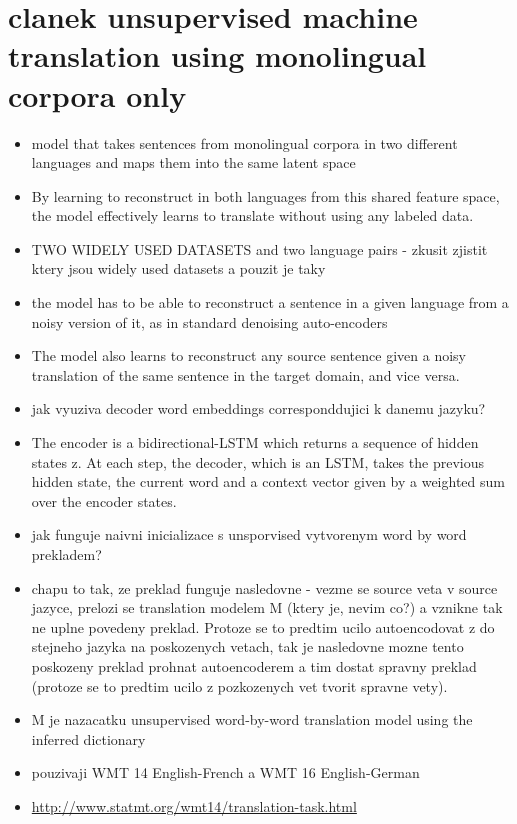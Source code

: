 \section{clanek unsupervised machine translation using monolingual corpora only}
\begin{itemize}
  \item model that takes sentences from monolingual corpora in two different languages and maps them into the same latent space
  \item By learning to reconstruct in both languages from this shared feature space, the model effectively learns to translate without using any labeled data.
  \item TWO WIDELY USED DATASETS and two language pairs - zkusit zjistit ktery jsou widely used datasets a pouzit je taky
  \item the model has to be able to reconstruct a sentence in a given language from a noisy version of it, as in standard denoising auto-encoders
  \item The model also learns to reconstruct any source sentence given a noisy translation of the same sentence in the target domain, and vice versa.
  \item jak vyuziva decoder word embeddings corresponddujici k danemu jazyku?
  \item The encoder is a bidirectional-LSTM which returns a sequence of hidden states z. At each step, the decoder, which is an LSTM, takes the previous hidden state, the current word and a context vector given by a weighted sum over the encoder states.
  \item jak funguje naivni inicializace s unsporvised vytvorenym word by word prekladem?
  \item chapu to tak, ze preklad funguje nasledovne - vezme se source veta v source jazyce, prelozi se translation modelem M (ktery je, nevim co?) a vznikne tak ne uplne povedeny preklad. Protoze se to predtim ucilo autoencodovat z do stejneho jazyka na poskozenych vetach, tak je nasledovne mozne tento poskozeny preklad prohnat autoencoderem a tim dostat spravny preklad (protoze se to predtim ucilo z pozkozenych vet tvorit spravne vety).
  \item M je nazacatku unsupervised word-by-word translation model using the inferred dictionary
  \item pouzivaji WMT 14 English-French a WMT 16 English-German
  \item \url{http://www.statmt.org/wmt14/translation-task.html}
\end{itemize}

